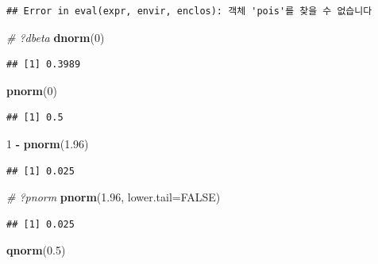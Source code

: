 \documentclass[10pt,]{krantz}
\makeatletter
\newenvironment{Shaded}{\begin{snugshade}}{\end{snugshade}}
\newcommand{\KeywordTok}[1]{\textcolor[rgb]{0.13,0.29,0.53}{\textbf{#1}}}
\newcommand{\DataTypeTok}[1]{\textcolor[rgb]{0.13,0.29,0.53}{#1}}
\newcommand{\DecValTok}[1]{\textcolor[rgb]{0.00,0.00,0.81}{#1}}
\newcommand{\FloatTok}[1]{\textcolor[rgb]{0.00,0.00,0.81}{#1}}
\newcommand{\StringTok}[1]{\textcolor[rgb]{0.31,0.60,0.02}{#1}}
\newcommand{\CommentTok}[1]{\textcolor[rgb]{0.56,0.35,0.01}{\textit{#1}}}
\newcommand{\OtherTok}[1]{\textcolor[rgb]{0.56,0.35,0.01}{#1}}
\newcommand{\OperatorTok}[1]{\textcolor[rgb]{0.81,0.36,0.00}{\textbf{#1}}}
\newcommand{\NormalTok}[1]{#1}
\newenvironment{kframe}{%
\medskip{}
\setlength{\fboxsep}{.8em}
 \def\at@end@of@kframe{}%
 \ifinner\ifhmode%
  \def\at@end@of@kframe{\end{minipage}}%
  \begin{minipage}{\columnwidth}%
 \fi\fi%
 \def\FrameCommand##1{\hskip\@totalleftmargin \hskip-\fboxsep
 \colorbox{shadecolor}{##1}\hskip-\fboxsep
     \hskip-\linewidth \hskip-\@totalleftmargin \hskip\columnwidth}%
 \MakeFramed {\advance\hsize-\width
   \@totalleftmargin\z@ \linewidth\hsize
   \@setminipage}}%
 {\par\unskip\endMakeFramed%
 \at@end@of@kframe}
\renewenvironment{Shaded}{\begin{kframe}}{\end{kframe}}
\makeatother
\begin{document}
\begin{verbatim}
## Error in eval(expr, envir, enclos): 객체 'pois'를 찾을 수 없습니다
\end{verbatim}

\begin{Shaded}
\begin{Highlighting}[]
\CommentTok{# ?dbeta}
\KeywordTok{dnorm}\NormalTok{(}\DecValTok{0}\NormalTok{)}
\end{Highlighting}
\end{Shaded}

\begin{verbatim}
## [1] 0.3989
\end{verbatim}

\begin{Shaded}
\begin{Highlighting}[]
\KeywordTok{pnorm}\NormalTok{(}\DecValTok{0}\NormalTok{)}
\end{Highlighting}
\end{Shaded}

\begin{verbatim}
## [1] 0.5
\end{verbatim}

\begin{Shaded}
\begin{Highlighting}[]
\DecValTok{1} \OperatorTok{-}\StringTok{ }\KeywordTok{pnorm}\NormalTok{(}\FloatTok{1.96}\NormalTok{)}
\end{Highlighting}
\end{Shaded}

\begin{verbatim}
## [1] 0.025
\end{verbatim}

\begin{Shaded}
\begin{Highlighting}[]
\CommentTok{# ?pnorm}
\KeywordTok{pnorm}\NormalTok{(}\FloatTok{1.96}\NormalTok{, }\DataTypeTok{lower.tail=}\OtherTok{FALSE}\NormalTok{)}
\end{Highlighting}
\end{Shaded}

\begin{verbatim}
## [1] 0.025
\end{verbatim}

\begin{Shaded}
\begin{Highlighting}[]
\KeywordTok{qnorm}\NormalTok{(}\FloatTok{0.5}\NormalTok{)}
\end{Highlighting}
\end{Shaded}
\end{document}

